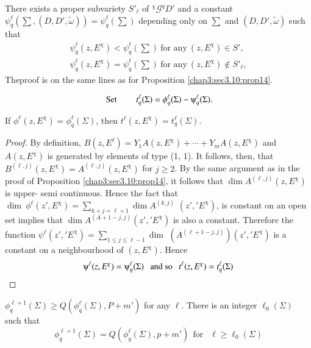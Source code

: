 \begin{proposition}\label{chap3:sec3.10:prop15}%
  There exists a proper subvariety $S'_{\ell}$ of $^\chi \mathscr{G}^q
  D'$ and a constant $\psi_q^{\ell} (\sum ,(D, D', \tilde{\omega})) =
  \psi^{\ell}_q (\sum)$ depending only on $\sum$ and $(D, D',
  \tilde{\omega})$ such that  
  \begin{gather*}
    \psi^\ell_q (z, E^\chi ) < \psi^{\ell}_{q} \left(\sum \right) ~\text{for any}~
    (z, E^\chi ) \in S',\\ 
    \psi^\ell_q (z, E^\chi ) = \psi^{\ell}_{q} \left(\sum \right) ~\text{for any}~
    (z, E^\chi ) \not\in S'_{\ell}, 
  \end{gather*}
  The\pageoriginale proof is on the same lines as for Proposition \ref{chap3:sec3.10:prop14}.
\end{proposition}
$$
\text{ Set }\qquad   t^\ell_q (\Sigma) = \phi^\ell_q (\Sigma)-
\psiup^\ell_q (\Sigma).  
$$

\begin{proposition}\label{chap3:sec3.10:prop16}%
  If $ \phi^\ell (z, E^\chi)= \phi^\ell_q (\Sigma)$, then $t^\ell(z,
  E^\chi)= t^\ell_q(\Sigma)$. 
\end{proposition}

\begin{proof}
  By definition, $B(z, E^\ell)= Y_1 A(z, E^\chi) + \cdots + Y_m A(z,
  E^\chi)$ and\break $A (z, E^\chi)$ is generated by elements of type (1,
  1). It follows, then, that $B^{(\ell, j)} (z, E^\chi)= A^{(\ell,
    j)} (z, E^\chi)$ for $j \ge 2$. By the same argument as in the
  proof of Proposition \ref{chap3:sec3.10:prop14}, it follows that $\dim A^{(\ell, j)}(z,
  E^\chi)$ is upper- semi continuous. Hence the fact that 
  $\dim ~\phi^\ell(z', E^\chi)= \sum\limits_{k +j = \ell +1} \dim A^{(k,
    j)}$ $(z', {'E}^\chi )$, is constant on an open set implies that $\dim
  A^{(A +1-j , j)} (z', {'E}^\chi)$ is also a constant. Therefore the
  function $\psi^\ell (z', {'E}^\chi)= \sum\limits_{1 \le j \le \ell-1} \dim$
   $(A^{(\ell+ 1-j,j)}) (z', {'E}^\chi )$ is a constant on a
  neighbourhood of $(z, E^\chi)$. Hence   
  $$
  \psiup^\ell (z, E^\chi)= \psiup^\ell_q(\Sigma)~~ \text{ and so }
  ~~t^\ell (z, E^\chi)= t^\ell_q (\Sigma) 
  $$
\end{proof}

\begin{proposition}\label{chap3:sec3.10:prop17}%
  $\phi^{\ell + 1}_q (\Sigma) \ge Q (\phi^\ell_q (\Sigma), P+m')$ for
  any $\ell$. There is an integer $\ell_0 (\Sigma)$ such that  
  $$
  \phi^{\ell +1}_q (\Sigma)= Q (\phi^\ell_q (\Sigma ),  p+m') ~~\text{
    for } ~~\ell \ge \ell_0 (\Sigma) 
  $$
\end{proposition}

